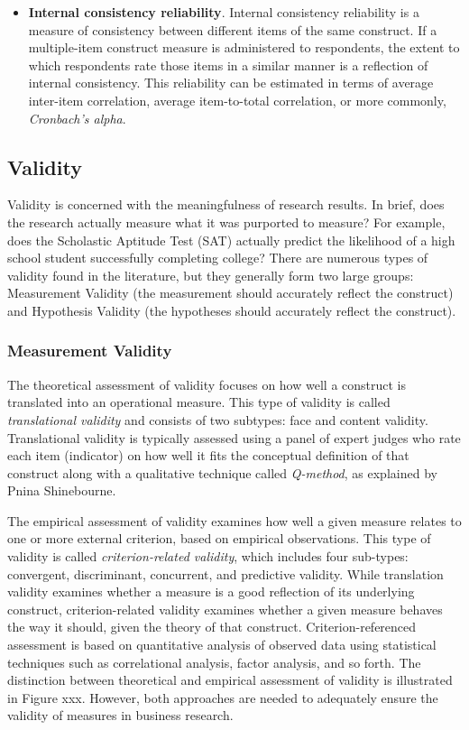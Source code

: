 \begin{itemize}
	\item \textbf{Internal consistency reliability}. Internal consistency reliability is a measure of consistency between different items of the same construct. If a multiple-item construct measure is administered to respondents, the extent to which respondents rate those items in a similar manner is a reflection of internal consistency. This reliability can be estimated in terms of average inter-item correlation, average item-to-total correlation, or more commonly, \textit{Cronbach’s alpha}. 

\end{itemize}

\subsection{Validity}

Validity is concerned with the meaningfulness of research results. In brief, does the research actually measure what it was purported to measure? For example, does the Scholastic Aptitude Test (SAT) actually predict the likelihood of a high school student successfully completing college?\cite{drost2011validity} There are numerous types of validity found in the literature, but they generally form two large groups: Measurement Validity (the measurement should accurately reflect the construct) and Hypothesis Validity (the hypotheses should accurately reflect the construct).

\subsubsection{Measurement Validity}

The theoretical assessment of validity focuses on how well a construct is translated into an operational measure. This type of validity is called \textit{translational validity} and consists of two subtypes: face and content validity. Translational validity is typically assessed using a panel of expert judges who rate each item (indicator) on how well it fits the conceptual definition of that construct along with a qualitative technique called \textit{Q-method}, as explained by Pnina Shinebourne\cite{shinebourne2009using}.

The empirical assessment of validity examines how well a given measure relates to one or more external criterion, based on empirical observations. This type of validity is called \textit{criterion-related validity}, which includes four sub-types: convergent, discriminant, concurrent, and predictive validity. While translation validity examines whether a measure is a good reflection of its underlying construct, criterion-related validity examines whether a given measure behaves the way it should, given the theory of that construct. Criterion-referenced assessment is based on quantitative analysis of observed data using statistical techniques such as correlational analysis, factor analysis, and so forth. The distinction between theoretical and empirical assessment of validity is illustrated in Figure xxx. However, both approaches are needed to adequately ensure the validity of measures in business research.

